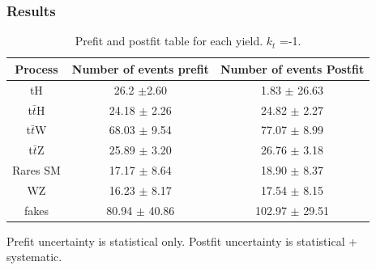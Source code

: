 \documentclass[11pt]{beamer}
\begin{document}
\begin{frame}
\frametitle{Results}

\begin{table}
\caption{Prefit and postfit table for each yield. $k_{t}$ =-1.}
	\begin{tabular}{|c|c|c|}
		\hline
		Process  & Number of events prefit    & Number of events Postfit \\
		\hline
		tH & 26.2 $\pm$2.60 & 1.83 $\pm$ 26.63\\
		\hline
		t$\bar{t}$H  & 24.18 $\pm$ 2.26& 24.82 $\pm$ 2.27\\
		\hline
		t$\bar{t}$W  & 68.03  $\pm$ 9.54 & 77.07 $\pm$ 8.99\\
		\hline
		t$\bar{t}$Z  & 25.89  $\pm$  3.20& 26.76 $\pm$ 3.18\\
		\hline
		Rares SM & 17.17  $\pm$ 8.64 & 18.90 $\pm$ 8.37\\
		\hline
		WZ & 16.23  $\pm$ 8.17& 17.54 $\pm$ 8.15\\
		\hline
		fakes  & 80.94   $\pm$ 40.86& 102.97 $\pm$ 29.51\\
		\hline
	\end{tabular}	
\end{table}
 Prefit uncertainty is statistical only. Postfit uncertainty is statistical + systematic.
\end{frame}
\end{document}
